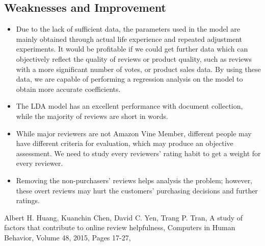 \documentclass{mcmthesis}
\begin{document}
\subsection{Weaknesses and Improvement}
\begin{itemize}
  \item Due to the lack of sufficient data, the parameters used in the model are mainly obtained through actual life experience and repeated adjustment experiments. It would be profitable if we could get further data which can objectively reflect the quality of reviews or product quality, such as reviews with a more significant number of votes, or product sales data. By using these data, we are capable of performing a regression analysis on the model to obtain more accurate coefficients.
\end{itemize}
\begin{itemize}
  \item The LDA model has an excellent performance with document collection, while the majority of reviews are short in words. 
\end{itemize}
\begin{itemize}
  \item While major reviewers are not Amazon Vine Member, different people may have different criteria for evaluation, which may produce an objective assessment. We need to study every reviewers' rating habit to get a weight for every reviewer.
\end{itemize}
\begin{itemize}
  \item Removing the non-purchasers' reviews helps analysis the problem; however, these overt reviews may hurt the customers' purchasing decisions and further ratings.
\end{itemize}

\begin{thebibliography}{99}
   Albert H. Huang, Kuanchin Chen, David C. Yen, Trang P. Tran,
  A study of factors that contribute to online review helpfulness,
  Computers in Human Behavior, Volume 48, 2015, Pages 17-27,
\end{thebibliography}
\end{document}
